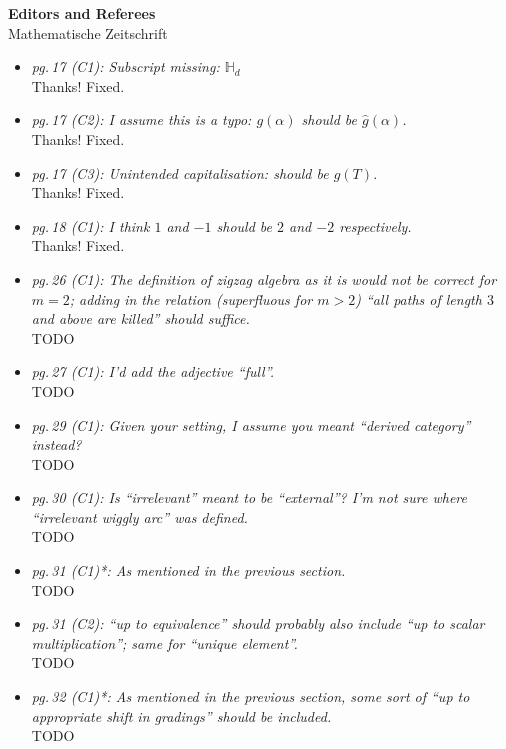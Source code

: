 \documentclass{letter}
\begin{document}
\begin{letter}{{\bf Editors and Referees} \\ Mathematische Zeitschrift}
\begin{itemize}
\item \textsl{\color{gray} pg.\,17 (C1): Subscript missing: $\mathbb{H}_d$} \\
Thanks! Fixed.

\item \textsl{\color{gray} pg.\,17 (C2): I assume this is a typo: $g(\alpha)$ should be $\hat{g}(\alpha)$.} \\
Thanks! Fixed.

\item \textsl{\color{gray} pg.\,17 (C3): Unintended capitalisation: should be $g(T)$.} \\
Thanks! Fixed.

\item \textsl{\color{gray} pg.\,18 (C1): I think $1$ and $-1$ should be $2$ and $-2$ respectively.} \\
Thanks! Fixed.

\item \textsl{\color{gray} pg.\,26 (C1): The definition of zigzag algebra as it is would not be correct for $m = 2$; adding in the relation (superfluous for $m > 2$) ``all paths of length $3$ and above are killed'' should suffice.} \\
TODO

\item \textsl{\color{gray} pg.\,27 (C1): I'd add the adjective ``full''.} \\
TODO

\item \textsl{\color{gray} pg.\,29 (C1): Given your setting, I assume you meant ``derived category'' instead?} \\
TODO

\item \textsl{\color{gray} pg.\,30 (C1): Is ``irrelevant'' meant to be ``external''? I’m not sure where ``irrelevant wiggly arc'' was defined.} \\
TODO

\item \textsl{\color{gray} pg.\,31 (C1)*: As mentioned in the previous section.} \\
TODO

\item \textsl{\color{gray} pg.\,31 (C2): ``up to equivalence'' should probably also include ``up to scalar multiplication''; same for ``unique element''.} \\
TODO

\item \textsl{\color{gray} pg.\,32 (C1)*: As mentioned in the previous section, some sort of ``up to appropriate shift in gradings'' should be included.} \\
TODO


\end{itemize}
\end{letter}
\end{document}
